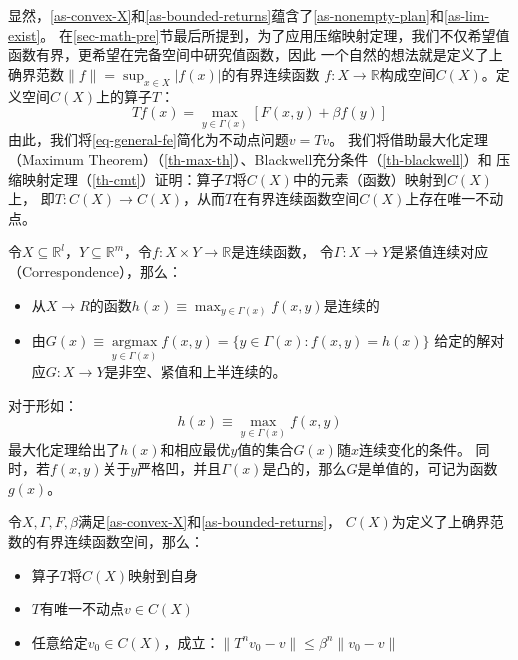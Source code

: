 显然，\cref{as-convex-X}和\cref{as-bounded-returns}蕴含了\cref{as-nonempty-plan}和\cref{as-lim-exist}。
在\ref{sec-math-pre}节最后所提到，为了应用压缩映射定理，我们不仅希望值函数有界，更希望在完备空间中研究值函数，因此
一个自然的想法就是定义了上确界范数$\|f\|=\sup _{x\in X}|f\left(x\right)|$的有界连续函数
$f: X\rightarrow \mathbb{R}$构成空间$C\left(X\right)$。定义空间$C\left(X\right)$上的算子$T$：
\begin{equation}
    Tf\left(x\right)=\max_{y\in\Gamma\left(x\right)}\left[F\left(x,y\right)+\beta f\left(y\right)\right]
\end{equation}
由此，我们将\cref{eq-general-fe}简化为不动点问题$v=Tv$。
我们将借助最大化定理（Maximum Theorem）（\cref{th-max-th}）、Blackwell充分条件（\cref{th-blackwell}）和
压缩映射定理（\cref{th-cmt}）证明：算子$T$将$C\left(X\right)$中的元素（函数）映射到$C\left(X\right)$上，
即$T: C\left(X\right)\rightarrow C\left(X\right)$，从而$T$在有界连续函数空间$C\left(X\right)$上存在唯一不动点。

\begin{theorem}    \label{th-max-th}
    令$X\subseteq\mathbb{R}^l$，$Y\subseteq\mathbb{R}^m$，令$f: X\times Y \rightarrow \mathbb{R}$是连续函数，
    令$\Gamma: X\rightarrow Y$是紧值连续对应（Correspondence），那么：
    \begin{itemize}
        \item 从$X\rightarrow R$的函数$h\left(x\right)\equiv \max _{y\in\Gamma\left(x\right)}f\left(x,y\right)$是连续的
        \item 由$G(x) \equiv \underset{y \in \Gamma(x)}{\operatorname{argmax}} f(x, y)=\{y \in \Gamma(x): f(x, y)=h(x)\}$
        给定的解对应$G: X\rightarrow Y$是非空、紧值和上半连续的。
    \end{itemize}
\end{theorem}
对于形如：
\begin{equation*}
    h\left(x\right)\equiv \max_{y\in\Gamma\left(x\right)}f\left(x,y\right)
\end{equation*}
最大化定理给出了$h\left(x\right)$和相应最优$y$值的集合$G\left(x\right)$随$x$连续变化的条件。
同时，若$f\left(x,y\right)$关于$y$严格凹，并且$\Gamma\left(x\right)$是凸的，那么$G$是单值的，可记为函数$g\left(x\right)$。

\begin{theorem}[$FE$问题解的存在及唯一性] \label{th-fe-solution-exist}
    令$X, \Gamma, F, \beta$满足\cref{as-convex-X}和\cref{as-bounded-returns}，
    $C\left(X\right)$为定义了上确界范数的有界连续函数空间，那么：
    \begin{itemize}
        \item 算子$T$将$C\left(X\right)$映射到自身
        \item $T$有唯一不动点$v\in C\left(X\right)$
        \item 任意给定$v_0\in C\left(X\right)$，成立：$\|T^nv_0-v\|\leq \beta^n \|v_0-v\|$
    \end{itemize}
\end{theorem}

